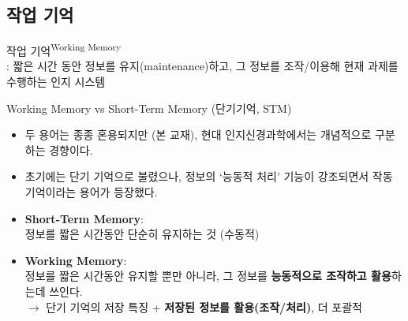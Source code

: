 \documentclass{beamer}
\begin{document}
\subsection{작업 기억}
\begin{frame}{작업 기억\textsuperscript{Working Memory}\\\normalsize : 짧은 시간 동안 정보를 유지(maintenance)하고, 그 정보를 조작/이용해 현재 과제를 수행하는 인지 시스템
}
  \begin{block}{Working Memory vs Short-Term Memory (단기기억, STM)}
    \begin{itemize}
      \item 두 용어는 종종 혼용되지만 (본 교재), 현대 인지신경과학에서는 개념적으로 구분하는 경향이다.
      \item 초기에는 단기 기억으로 불렸으나, 정보의 `능동적 처리' 기능이 강조되면서 작동 기억이라는 용어가 등장했다.
      \item \textbf{Short-Term Memory}: \\정보를 짧은 시간동안 단순히 유지하는 것 (수동적)
      \item \textbf{Working Memory}: \\정보를 짧은 시간동안 유지할 뿐만 아니라, 그 정보를 \textbf{능동적으로 조작하고 활용}하는데 쓰인다.\\
        $\rightarrow$ 단기 기억의 저장 특징 + \textbf{저장된 정보를 활용(조작/처리)}, 더 포괄적
    \end{itemize}
  \end{block}
\end{frame}
\end{document}
